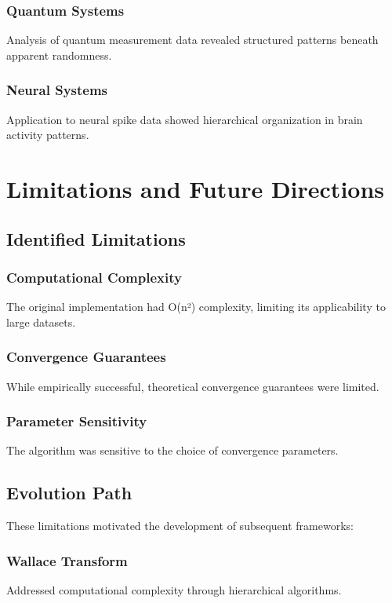 \documentclass[12pt]{article}
\begin{document}
\subsubsection{Quantum Systems}
Analysis of quantum measurement data revealed structured patterns beneath apparent randomness.

\subsubsection{Neural Systems}
Application to neural spike data showed hierarchical organization in brain activity patterns.

\section{Limitations and Future Directions}

\subsection{Identified Limitations}

\subsubsection{Computational Complexity}
The original implementation had O(n²) complexity, limiting its applicability to large datasets.

\subsubsection{Convergence Guarantees}
While empirically successful, theoretical convergence guarantees were limited.

\subsubsection{Parameter Sensitivity}
The algorithm was sensitive to the choice of convergence parameters.

\subsection{Evolution Path}

These limitations motivated the development of subsequent frameworks:

\subsubsection{Wallace Transform}
Addressed computational complexity through hierarchical algorithms.
\end{document}
